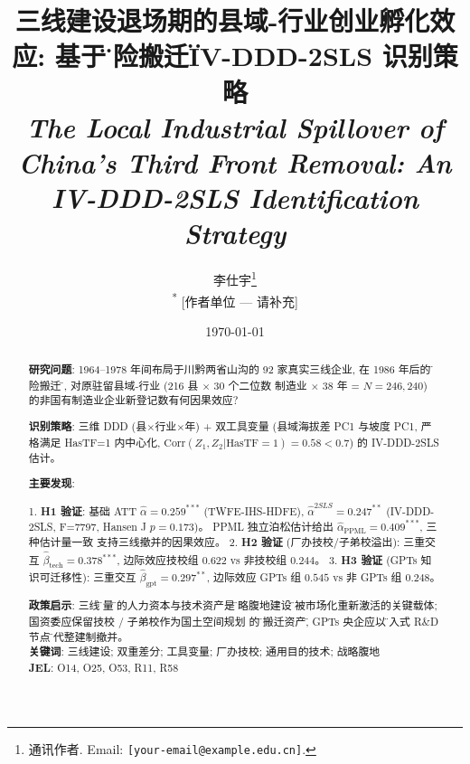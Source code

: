 \documentclass[11pt,a4paper]{article}
\title{%
  \textbf{三线建设退场期的县域-行业创业孵化效应:%
        基于\"脱险搬迁\"IV-DDD-2SLS 识别策略}\\[0.3em]
  \large\textit{The Local Industrial Spillover of China's Third Front Removal:\newline
        An IV-DDD-2SLS Identification Strategy}
}
\author{
  李仕宇\footnote{通讯作者.
    Email: \texttt{[your-email@example.edu.cn]}.}
  \\[0.5em]
  \small\textsuperscript{*} [作者单位 --- 请补充]
}
\date{\today}
\begin{document}
\maketitle

\begin{abstract}
\noindent
\textbf{研究问题}: 1964--1978 年间布局于川黔两省山沟的 92 家真实三线企业,
在 1986 年后的\"脱险搬迁\"中, 对原驻留县域-行业 (216 县 $\times$ 30 个二位数
制造业 $\times$ 38 年 = $N=246{,}240$) 的非国有制造业企业新登记数有何因果效应?

\textbf{识别策略}: 三维 DDD (县$\times$行业$\times$年) + 双工具变量 (县域海拔差 PC1
与坡度 PC1, 严格满足 HasTF=1 内中心化, $\mathrm{Corr}(Z_1,Z_2|\mathrm{HasTF=1})=0.58<0.7$)
的 IV-DDD-2SLS 估计。

\textbf{主要发现}:

1. \textbf{H1 验证}: 基础 ATT $\hat{\alpha}=0.259^{***}$ (TWFE-IHS-HDFE),
   $\hat{\alpha}^{2SLS}=0.247^{**}$ (IV-DDD-2SLS, F=7797, Hansen J $p=0.173$)。
   PPML 独立泊松估计给出 $\hat{\alpha}_{\mathrm{PPML}}=0.409^{***}$, 三种估计量一致
   支持三线撤并的因果效应。
2. \textbf{H2 验证} (厂办技校/子弟校溢出): 三重交互 $\hat{\beta}_{\mathrm{tech}}=0.378^{***}$, 边际效应技校组 $0.622$ vs 非技校组 $0.244$。
3. \textbf{H3 验证} (GPTs 知识可迁移性): 三重交互 $\hat{\beta}_{\mathrm{gpt}}=0.297^{**}$, 边际效应 GPTs 组 $0.545$ vs 非 GPTs 组 $0.248$。

\textbf{政策启示}: 三线\"存量\"中的人力资本与技术资产是\"战略腹地建设\"
可被市场化重新激活的关键载体; 国资委应保留技校 / 子弟校作为国土空间规划
的\"非搬迁资产\", GPTs 央企应以\"嵌入式 R\&D 节点\"替代整建制撤并。\\
\textbf{关键词}: 三线建设; 双重差分; 工具变量; 厂办技校; 通用目的技术; 战略腹地\\
\textbf{JEL}: O14, O25, O53, R11, R58
\end{abstract}

\tableofcontents

\newpage






\end{document}
